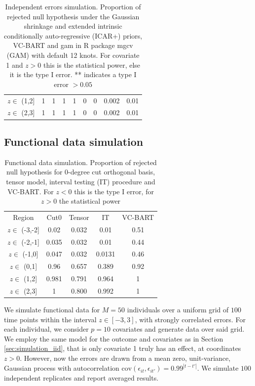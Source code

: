 \begin{table}
\begin{center}
\begin{tabular}{ccccccccc}
$z \in $  (1,2] &   1      & 1        &  1        & 1           & 0     & 0    & 0.002      &  0.01 \\ 
$z \in $  (2,3] &   1      & 1        &  1        & 1           & 0     & 0    & 0.002      &  0.01 \\ 
\end{tabular}
\end{center}
\caption{Independent errors simulation. Proportion of rejected null hypothesis under the Gaussian shrinkage and extended intrinsic conditionally auto-regressive (ICAR+) priors, VC-BART and gam in R package mgcv (GAM) with default 12 knots. 
For covariate 1 and $z>0$ this is the statistical power, else it is the type I error. ** indicates a type I error $>0.05$}
\label{tab:simiid}
\end{table}




\subsection{Functional data simulation}
\label{sec:simulation_fda}


\begin{table}
\begin{center}
\begin{tabular}{ccccc} 
 Region          & Cut0 & Tensor & IT       & VC-BART  \\  
$z \in $ (-3,-2] & 0.02 & 0.032&   0.01   &  0.51 \\ 
$z \in $ (-2,-1] & 0.035& 0.032&   0.01   &  0.44 \\ 
$z \in $  (-1,0] & 0.047& 0.032&  0.0131  &  0.46 \\
$z \in $   (0,1] & 0.96 & 0.657&     0.389&  0.92 \\ 
$z \in $   (1,2] & 0.981& 0.791&     0.964&  1    \\ 
$z \in $   (2,3] & 1    & 0.800&    0.992 &  1    \\ 
\end{tabular}
\end{center}
\caption{Functional data simulation. Proportion of rejected null hypothesis for 0-degree cut orthogonal basis, tensor model, interval testing (IT) procedure  and VC-BART. For $z<0$ this is the type I error, for $z>0$ the statistical power}
\label{tab:simfda}
\end{table}

We simulate functional data for $M=50$ individuals over a uniform grid of $100$ time points within the interval $z \in [-3,3]$, with strongly correlated errors. For each individual, we consider  $p=10$ covariates and generate data over said grid. We employ the same  model for the outcome and covariates as in Section \ref{sec:simulation_iid}, that is  only covariate 1 truly has an effect, at coordinates $z > 0$. However,  now the errors are drawn from a mean zero, unit-variance, Gaussian process with autocorrelation $\mbox{cov}(\epsilon_{it}, \epsilon_{it'})= 0.99^{|t-t'|}$. We simulate $100$ independent replicates and report averaged results.

